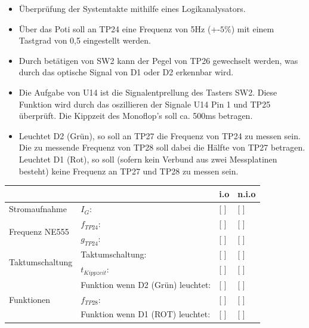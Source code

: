 \documentclass[a4paper,11pt]{scrartcl}
\begin{document}
\begin{itemize}
	\item{Überprüfung der Systemtakte mithilfe eines Logikanalysators.}
	
	 \item{Über das Poti soll an TP24 eine Frequenz von 5Hz (+-$5\%$) mit einem Tastgrad von 0,5 eingestellt werden.}
	 
	 \item{Durch betätigen von SW2 kann der Pegel von TP26 gewechselt werden, was durch das optische Signal von D1 oder D2 erkennbar wird.}
	 
	 \item{Die Aufgabe von U14 ist die Signalentprellung des Tasters SW2. Diese Funktion wird durch das oszillieren der Signale U14 Pin 1 und TP25 überprüft. Die Kippzeit des Monoflop's soll ca. 500ms betragen.}
	 
	 \item{Leuchtet D2 (Grün), so soll an TP27 die Frequenz von TP24 zu messen sein. Die zu messende Frequenz von TP28 soll dabei die Hälfte von TP27 betragen. Leuchtet D1 (Rot), so soll (sofern kein Verbund aus zwei Messplatinen besteht) keine Frequenz an TP27 und TP28 zu messen sein.}	 
\end{itemize}


\renewcommand{\arraystretch}{2}
\begin{tabularx}{\textwidth}{p{}| p{} | p{} | p{}}

 &  & i.o & n.i.o \\

\hline

Stromaufnahme & $I_{G}$: & [ ] & [ ] \\

\hline

\multirow{2}{*}{Frequenz NE555 }
		& $f_{TP24}$: 				& [ ] & [ ] \\
		& $g_{TP24}$:				& [ ] & [ ] \\

\hline

\multirow{2}{*}{Taktumschaltung}
		& Taktumschaltung:				&	[ ] & [ ] 	\\
		& $t_{Kippzeit}$: 				&	[ ]	& [ ] 	\\
	
\hline		
		
\multirow{3}{*}{Funktionen}
		& Funktion wenn D2 (Grün) leuchtet:  			& [ ] & [ ] 	\\
		& $f_{TP28}$: 									& [ ] & [ ] 	\\
		& Funktion wenn D1 (ROT) leuchtet:				& [ ] & [ ] 	\\ 

\end{tabularx}
\renewcommand{\arraystretch}{1}
\end{document}
